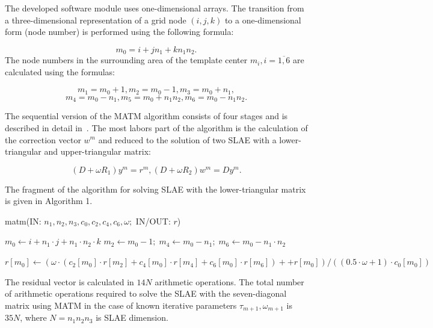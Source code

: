\documentclass{svproc}
\begin{document}
The developed software module uses one-dimensional arrays. The transition from a three-dimensional representation of a grid node $(i, j, k)$  to a one-dimensional form (node number) is performed using the following formula:

\begin{equation*}
	m_0=i+jn_1+kn_1n_2.
\end{equation*}
The node numbers in the surrounding area of the template center  $m_i, i=\overline{1, 6} $ are calculated using the formulas:

\begin{equation*}
	m_1=m_0+1, m_2=m_0-1, m_3=m_0+n_1,
\end{equation*}
\begin{equation*}
	m_4=m_0-n_1, m_5=m_0+n_1n_2, m_6=m_0-n_1n_2.
\end{equation*}

The sequential version of the MATM algorithm consists of four stages and is described in detail in~\cite{2021:Sukhinov:Litvinov}.
The most labors part of the algorithm is the calculation of the correction vector $w^m$ and reduced to the solution of two SLAE with a lower-triangular and upper-triangular matrix:

\begin{equation*}
	(D+\omega R_1)y^m = r^m,  (D+\omega R_2)w^m = Dy^m.
\end{equation*}

The fragment of the algorithm  for solving SLAE with the lower-triangular matrix is given in Algorithm 1.
\begin{algorithm}
	\caption{matm(IN: $n_1, n_2, n_3, c_0, c_2, c_4, c_6, \omega;$ IN/OUT: $r$)}\label{alg:matm}
	\begin{algorithmic}[1]
		
		\State $m_0 \gets i + n_1 \cdot j + n_1 \cdot n_2 \cdot k$
		\State $m_2 \gets m_0 - 1;\; m_4 \gets m_0 - n_1;\; m_6 \gets m_0 - n_1 \cdot n_2$
		
		\State \parbox[t]{\dimexpr\linewidth-\algorithmicindent-\algorithmicindent-\algorithmicindent-\algorithmicindent-\algorithmicindent}{$ r[m_0] \gets (\omega \cdot (c_2[m_0] \cdot r[m_2] + c_4[m_0] \cdot r[m_4] + c_6[m_0] \cdot r[m_6]) +
			+ r[m_0]) / ((0.5 \cdot \omega + 1) \cdot c_0[m_0]) $}
		
		\EndIf
		\EndFor
		\EndFor
		\EndFor
		
	\end{algorithmic}
\end{algorithm}
The residual vector is calculated in $14N$ arithmetic operations. 
The total number of arithmetic operations required to solve the SLAE with the seven-diagonal matrix using MATM in the case of known iterative parameters $\tau _{m+1}, \omega _{m+1}$ is $35N$, where $N = n_1 n_2 n_3$ is SLAE dimension.
\end{document}
